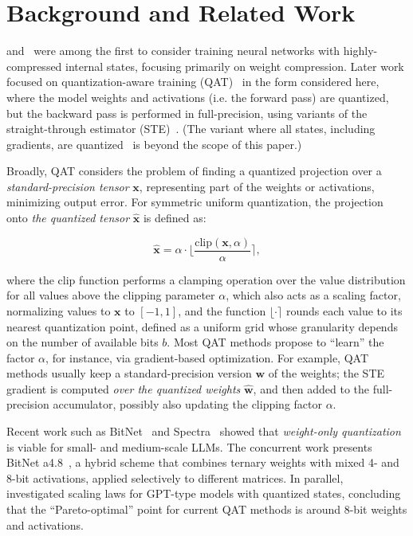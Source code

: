 \section{Background and Related Work}
\label{sec:background}

\citet{hubara2016binarized} and~\citet{rastegari2016xnor} were among the first to consider training neural networks with highly-compressed internal states, focusing primarily on weight compression. 
Later work focused on quantization-aware training (QAT)~\citep{jacob2018qat, choi2018pact, esser2019learned, bhalgat2020lsqplus} in the form considered here, where the model weights and activations (i.e. the forward pass) are quantized, but the backward pass is performed in full-precision, using variants of the straight-through estimator (STE)~\citep{bengio2013estimating}. (The variant where all states, including gradients, are quantized~\citep{switchback, jetfire} is beyond the scope of this paper.) 


Broadly, QAT considers the problem of finding a quantized projection over a \emph{standard-precision tensor} $\mathbf{x}$, representing part of the weights or activations, minimizing output error. For symmetric uniform quantization, the projection onto \emph{the quantized tensor} $\hat{\mathbf{x}}$ is defined as:  

\begin{equation}
\hat{\mathbf{x}} = \alpha \cdot \biggl\lfloor\frac{\text{clip}(\mathbf{x}, \alpha)}{\alpha}\biggr\rceil,
\label{eqn:quant}
\end{equation}

\noindent where the $\text{clip}$ function performs a clamping operation over the value distribution for all values above the clipping parameter $\alpha$, which also acts as a scaling factor, normalizing values to $\mathbf{x}$ to $[-1, 1]$, and the function $\lfloor \cdot \rceil$ rounds each value to its nearest quantization point, defined as a uniform grid whose granularity depends on the number of available bits $b$. Most QAT methods propose to ``learn'' the factor $\alpha$, for instance, via gradient-based optimization. 
For example, QAT methods usually keep a standard-precision version $\mathbf{w}$ of the weights; the STE gradient is computed \emph{over the quantized weights} $\widehat{\mathbf{w}}$, and then added to the full-precision accumulator, possibly also updating the clipping factor $\alpha$. 

Recent work such as BitNet~\cite{wang2023bitnet, ma2024era1bitllmslarge} and Spectra~\citep{kaushal2024spectra} showed that \emph{weight-only quantization} is viable for small- and medium-scale LLMs. The concurrent work presents BitNet a4.8~\citep{wang2024bitnet48}, a hybrid scheme that combines ternary weights with mixed 4- and 8-bit activations, applied selectively to different matrices. 
In parallel,~\citet{kumar2024scaling} investigated scaling laws for GPT-type models with quantized states, concluding that the ``Pareto-optimal'' point for current QAT methods is around 8-bit weights and activations.


